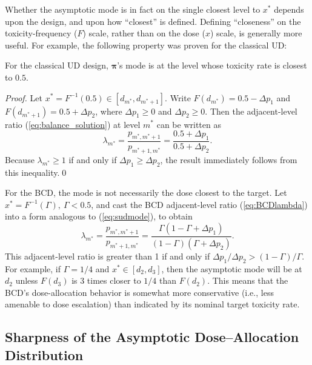 Whether the asymptotic mode is in fact on the single closest level to $x^*$ depends upon the design, and upon how ``closest'' is defined. Defining ``closeness'' on the toxicity-frequency ($F$) scale, rather than on the dose ($x$) scale, is generally more useful. For example, the following property was proven for the classical UD:
%
\begin{thm}\label{thm:modesud}
\citep{Oron:Hoff:thek:2009}
For the classical UD design, $\boldsymbol{\pi}$'s mode is at the level whose toxicity rate is closest to $0.5$.
\end{thm}
\begin{proof} Let $x^*=F^{-1}(0.5)\in [d_{m^*},d_{m^*+1}]$. Write $F\left(d_{m^*}\right)=0.5-\Delta p_1$ and $F\left(d_{m^*+1}\right)=0.5+\Delta p_2$, where $\Delta p_1\geq 0$ and $\Delta p_2\geq 0$. Then the adjacent-level ratio (\ref{eq:balance_solution}) at level $m^*$ can be written as
\begin{equation}\label{eq:sudmode}
\lambda_{m^*}=\frac{p_{m^*,m^*+1}}{p_{m^*+1,m^*}}=\frac{0.5+\Delta p_1}{0.5+\Delta p_2}.
\end{equation}
\noindent Because $\lambda_{m^*}\geq 1$ if and only if $\Delta p_1\geq\Delta p_2$, the result immediately follows from this inequality.\qed
\end{proof}
%
For the BCD, the mode is not necessarily the dose closest to the target. Let $x^*=F^{-1}(\Gamma),\ \Gamma<0.5$, and cast the BCD adjacent-level ratio (\ref{eq:BCDlambda}) into a form analogous to (\ref{eq:sudmode}), to obtain
\begin{equation*}
\lambda_{m^*}=\frac{p_{m^*,m^*+1}}{p_{m^*+1,m^*}}=\frac{\Gamma\left(1-\Gamma+\Delta p_1\right)}{(1-\Gamma)\left(\Gamma+\Delta p_2\right)}.
\end{equation*}
%
\noindent This adjacent-level ratio is greater than 1 if and only if $\Delta p_1/\Delta p_2>(1-\Gamma)/\Gamma$. For example, if $\Gamma=1/4$ and $x^*\in\left[d_2,d_3\right]$, then the asymptotic mode will be at $d_2$ unless $F\left(d_3\right)$ is 3 times closer to $1/4$ than $F\left(d_2\right)$. This means that the BCD's dose-allocation behavior is somewhat more conservative (i.e., less amenable to dose escalation) than indicated by its nominal target toxicity rate.

\subsection{Sharpness of the Asymptotic Dose--Allocation Distribution}

